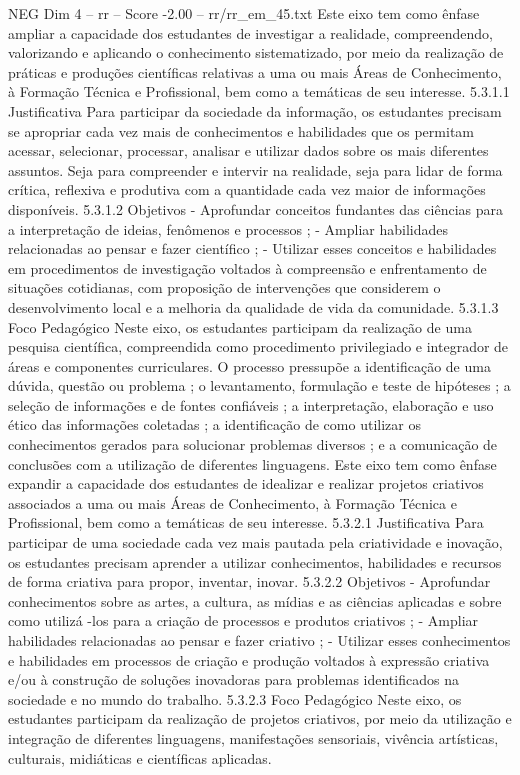\begin{textsample}{NEG Dim 4 – rr – Score -2.00 – rr/rr\_em\_45.txt}  \label{ex:f4_neg_177}
Este eixo tem como ênfase ampliar a capacidade dos estudantes de investigar a realidade, compreendendo, valorizando e aplicando o conhecimento sistematizado, por meio da realização de práticas e produções científicas relativas a uma ou mais Áreas de Conhecimento, à Formação Técnica e Profissional, bem como a temáticas de seu interesse. 5.3.1.1 Justificativa Para participar da sociedade da informação, os estudantes precisam se apropriar cada vez mais de conhecimentos e habilidades que os permitam acessar, selecionar, processar, analisar e utilizar dados sobre os mais diferentes assuntos.
Seja para compreender e intervir na realidade, seja para lidar de forma crítica, reflexiva e produtiva com a quantidade cada vez maior de informações disponíveis. 5.3.1.2 Objetivos - Aprofundar conceitos fundantes das ciências para a interpretação de ideias, fenômenos e processos ; - Ampliar habilidades relacionadas ao pensar e fazer científico ; - Utilizar esses conceitos e habilidades em procedimentos de investigação voltados à compreensão e enfrentamento de situações cotidianas, com proposição de intervenções que considerem o desenvolvimento local e a melhoria da qualidade de vida da comunidade. 5.3.1.3 Foco Pedagógico Neste eixo, os estudantes participam da realização de uma pesquisa científica, compreendida como procedimento privilegiado e integrador de áreas e componentes curriculares.
O processo pressupõe a identificação de uma dúvida, questão ou problema ; o levantamento, formulação e teste de hipóteses ; a seleção de informações e de fontes confiáveis ; a interpretação, elaboração e uso ético das informações coletadas ; a identificação de como utilizar os conhecimentos gerados para solucionar problemas diversos ; e a comunicação de conclusões com a utilização de diferentes linguagens.
Este eixo tem como ênfase expandir a capacidade dos estudantes de idealizar e realizar projetos criativos associados a uma ou mais Áreas de Conhecimento, à Formação Técnica e Profissional, bem como a temáticas de seu interesse. 5.3.2.1 Justificativa Para participar de uma sociedade cada vez mais pautada pela criatividade e inovação, os estudantes precisam aprender a utilizar conhecimentos, habilidades e recursos de forma criativa para propor, inventar, inovar. 5.3.2.2 Objetivos - Aprofundar conhecimentos sobre as artes, a cultura, as mídias e as ciências aplicadas e sobre como utilizá -los para a criação de processos e produtos criativos ; - Ampliar habilidades relacionadas ao pensar e fazer criativo ; - Utilizar esses conhecimentos e habilidades em processos de criação e produção voltados à expressão criativa e/ou à construção de soluções inovadoras para problemas identificados na sociedade e no mundo do trabalho. 5.3.2.3 Foco Pedagógico Neste eixo, os estudantes participam da realização de projetos criativos, por meio da utilização e integração de diferentes linguagens, manifestações sensoriais, vivência artísticas, culturais, midiáticas e científicas aplicadas.

\end{textsample}
